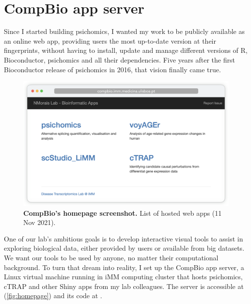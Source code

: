 \chapter{CompBio app server}
\label{chap:app-server}

Since I started building psichomics, I wanted my work to be publicly available as an online web app, providing users the most up-to-date version at their fingerprints, without having to install, update and manage different versions of R, Bioconductor, psichomics and all their dependencies.
Five years after the first Bioconductor release of psichomics in 2016, that vision finally came true.

\begin{figure}[!b]
  \includegraphics[width=.89\textwidth]{images/app-server/homepage}
  \centering
  \caption[Screenshot of CompBio's homepage]{\textbf{CompBio's homepage screenshot.} List of hosted web apps (11 Nov 2021).}
  \label{fig:homepage}
\end{figure}

One of our lab's ambitious goals is to develop interactive visual tools to assist in exploring biological data, either provided by users or available from big datasets. We want our tools to be used by anyone, no matter their computational background. To turn that dream into reality, I set up the CompBio app server, a Linux virtual machine running in iMM computing cluster that hosts psichomics, cTRAP and other Shiny apps from my lab colleagues. The server is accessible at  (\autoref{fig:homepage}) and its code at .


